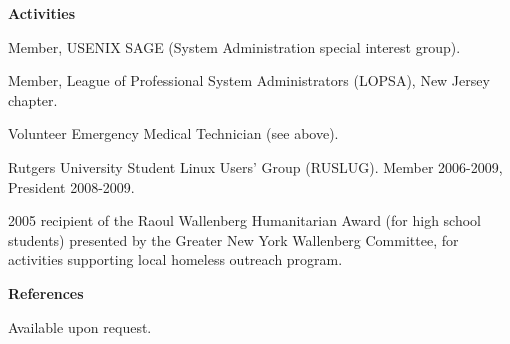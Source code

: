 \documentclass[letterpaper,11pt]{article}
\newcommand{\resheading}[1]{{\large \colorbox{mygrey}{\begin{minipage}{\textwidth}{\textbf{#1 \vphantom{p\^{E}}}}\end{minipage}}}}
\begin{document}
\resheading{Activities}
	\begin{description}
		\item Member, USENIX SAGE (System Administration special
                  interest group).
                \item Member, League of Professional System Administrators
                  (LOPSA), New Jersey chapter.
                \item Volunteer Emergency Medical Technician (see above).
                \item Rutgers University Student Linux Users' Group
                  (RUSLUG). Member 2006-2009, President 2008-2009.
                \item 2005 recipient of the Raoul Wallenberg Humanitarian
                  Award (for high school students) presented by the Greater
                  New York Wallenberg Committee, for activities supporting
                  local homeless outreach program.
	\end{description}

\resheading{References}
\begin{description}
\item{Available upon request.}
\end{description}
\end{document}
